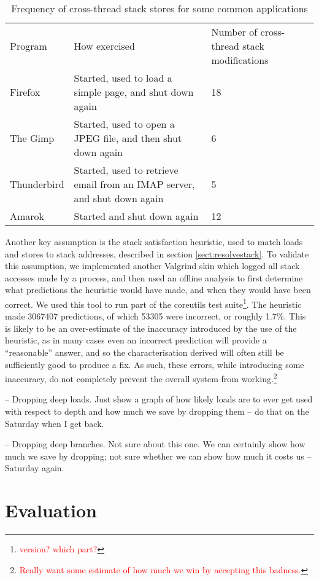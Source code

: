 \documentclass[10pt,twocolumn,preprint,natbib,authoryear]{sigplanconf}
\newcommand{\editorial}[1]{\textcolor{red}{\footnote{\textcolor{red}{#1}}}}
\begin{document}
\begin{table}
\begin{tabular}{lll}
Program & How exercised & Number of cross-thread stack modifications \\
Firefox & Started, used to load a simple page, and shut down again & 18 \\
The Gimp & Started, used to open a JPEG file, and then shut down again & 6 \\
Thunderbird & Started, used to retrieve email from an IMAP server, and shut down again & 5\\
Amarok & Started and shut down again & 12
\end{tabular}
\caption{Frequency of cross-thread stack stores for some common applications}
\label{tab:xthreadfreq}
\end{table}

Another key assumption is the stack satisfaction heuristic, used to
match loads and stores to stack addresses, described in section
\ref{sect:resolvestack}.  To validate this assumption, we implemented
another Valgrind skin which logged all stack accesses made by a
process, and then used an offline analysis to first determine what
predictions the heuristic would have made, and when they would have
been correct.  We used this tool to run part of the coreutils test
suite\editorial{version? which part?}.  The heuristic made 3067407
predictions, of which 53305 were incorrect, or roughly 1.7\%.  This is
likely to be an over-estimate of the inaccuracy introduced by the use
of the heuristic, as in many cases even an incorrect prediction will
provide a ``reasonable'' answer, and so the characterisation derived
will often still be sufficiently good to produce a fix.  As such,
these errors, while introducing some inaccuracy, do not completely
prevent the overall system from working.\editorial{Really want some
  estimate of how much we win by accepting this badness.}

-- Dropping deep loads.  Just show a graph of how likely loads are to
ever get used with respect to depth and how much we save by dropping
them -- do that on the Saturday when I get back.

-- Dropping deep branches.  Not sure about this one.  We can certainly
show how much we save by dropping; not sure whether we can show how
much it costs us -- Saturday again.

\section{Evaluation}
\end{document}
